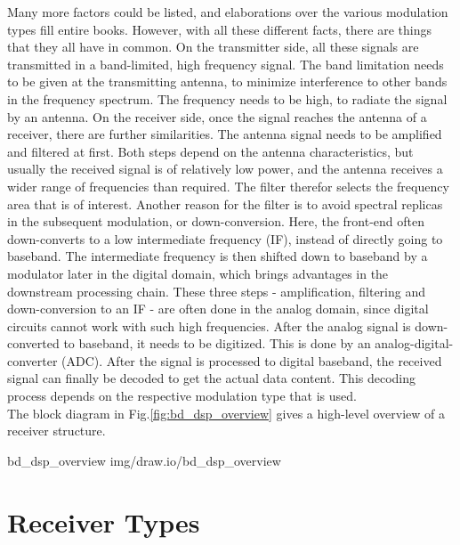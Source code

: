 Many more factors could be listed, and elaborations over the various modulation types fill entire books.
However, with all these different facts, there are things that they all have in common.
On the transmitter side, all these signals are transmitted in a band-limited, high frequency signal.
The band limitation needs to be given at the transmitting antenna, to minimize interference to other bands in the frequency spectrum.
The frequency needs to be high, to radiate the signal by an antenna.
On the receiver side, once the signal reaches the antenna of a receiver, there are further similarities.
The antenna signal needs to be amplified and filtered at first.
Both steps depend on the antenna characteristics, but usually the received signal is of relatively low power, and the antenna receives a wider range of frequencies than required.
The filter therefor selects the frequency area that is of interest.
Another reason for the filter is to avoid spectral replicas in the subsequent modulation, or down-conversion.
Here, the front-end often down-converts to a low intermediate frequency (IF), instead of directly going to baseband.
The intermediate frequency is then shifted down to baseband by a modulator later in the digital domain, which brings advantages in the downstream processing chain. %
These three steps - amplification, filtering and down-conversion to an IF - are often done in the analog domain, since digital circuits cannot work with such high frequencies.
After the analog signal is down-converted to baseband, it needs to be digitized.
This is done by an analog-digital-converter (ADC).
After the signal is processed to digital baseband, the received signal can finally be decoded to get the actual data content.
This decoding process depends on the respective modulation type that is used.\\

\noindent
The block diagram in Fig.\ref{fig:bd_dsp_overview} gives a high-level overview of a receiver structure.

 {bd_dsp_overview} {img/draw.io/bd_dsp_overview}

\section{Receiver Types}

